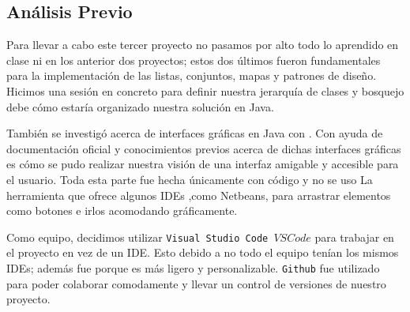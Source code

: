 \subsection*{Análisis Previo}

Para llevar a cabo este tercer proyecto no pasamos por alto todo lo aprendido en clase ni en los anterior
dos proyectos; estos dos últimos fueron fundamentales para la implementación de las listas, conjuntos, mapas
y patrones de diseño. Hicimos una sesión en concreto para definir nuestra jerarquía de clases y bosquejo debe
cómo estaría organizado nuestra solución en Java.

También se investigó acerca de interfaces gráficas en Java con . Con ayuda de documentación
oficial y conocimientos previos acerca de dichas interfaces gráficas es cómo se pudo realizar nuestra visión de
una interfaz amigable y accesible para el usuario. Toda esta parte fue hecha únicamente con código y no se uso La
herramienta que ofrece algunos IDEs ,como Netbeans, para arrastrar elementos como botones e irlos acomodando gráficamente.

  Como equipo, decidimos utilizar \texttt{Visual Studio Code \(VS Code\)} para trabajar en el proyecto en vez de un IDE. Esto debido a no todo
  el equipo tenían los mismos IDEs; además fue porque es más ligero y personalizable. \texttt{Github} fue utilizado para poder colaborar
  comodamente y llevar un control de versiones de nuestro proyecto.